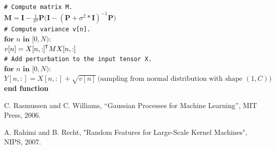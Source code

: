 \documentclass[a4paper,onecolumn]{article}
\newcommand{\bs}[1]{\boldsymbol{#1}}
\newcommand{\tran}{^{\mkern-1.5mu\mathsf{T}}}
\begin{document}
\begin{algorithm}[t]
        \vspace*{-6pt}
        \noindent\hspace*{\algorithmicindent}
        \texttt{\# Compute matrix M.} \\[1pt]
        \noindent\hspace*{\algorithmicindent}
        $\bs{M} = \bs{I} - \frac{1}{\sigma^2} \bs{P} \bigl( \bs{I} - (\bs{P} + \sigma^2 * \bs{I})^{-1} \bs{P} \bigr)$ \\

        \vspace*{-6pt}
        \noindent\hspace*{\algorithmicindent}
        \texttt{\# Compute variance v[n].} \\[1pt]
        \noindent\hspace*{\algorithmicindent}
        $\textbf{for} \,\, n \,\, \textbf{in} \,\, [0, N):$ \\
        \noindent\hspace*{\algorithmicindent}\hspace*{\algorithmicindent}
        $v[n] = X[n, :]\tran M X[n, :]$ \\

        \vspace*{-6pt}
        \noindent\hspace*{\algorithmicindent}
        \texttt{\# Add perturbation to the input tensor X.} \\[1pt]
        \noindent\hspace*{\algorithmicindent}
        $\textbf{for} \,\, n \,\, \textbf{in} \,\, [0, N):$ \\
        \noindent\hspace*{\algorithmicindent}\hspace*{\algorithmicindent}
        $Y[n, :] = X[n, :] + \sqrt{v[n]} \, \bigl( \textrm{sampling from normal distribution with shape} \,\, (1, C) \bigr)$ \\[5pt]
    \textbf{end function}
 
\end{algorithm}


\begin{thebibliography}{9}

        C. Rasmussen and C. Williams, “Gaussian Processes for Machine Learning”, MIT Press, 2006.

        A. Rahimi and B. Recht, "Random Features for Large-Scale Kernel Machines", NIPS, 2007.

\end{thebibliography}
\end{document}
